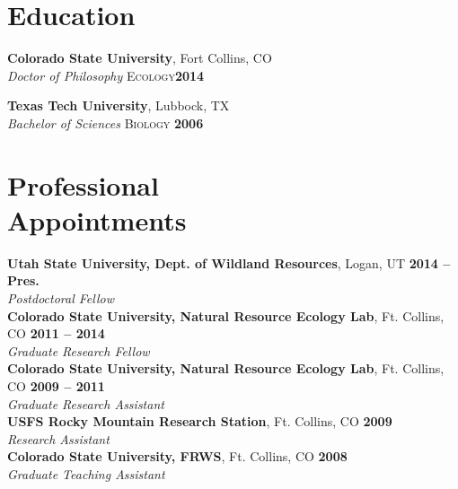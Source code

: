 \documentclass[margin,line]{resume}
\begin{document}
\begin{resume}
    \section{\mysidestyle Education}

    \textbf{Colorado State University}, Fort Collins, CO \vspace{1mm}\\\vspace{1mm}%
    \textsl{Doctor of Philosophy} \textsc{Ecology}\hfill \textbf{2014}\vspace{-3mm}\\\vspace{-1mm}%
    
    \textbf{Texas Tech University}, Lubbock, TX \vspace{1mm}\\\vspace{1mm}%
    \textsl{Bachelor of Sciences} \textsc{Biology} \hfill \textbf{2006}\vspace{-3mm}\\\vspace{-1mm}%
    
    \section{\mysidestyle Professional\\Appointments}
    \textbf{Utah State University, Dept. of Wildland Resources}, Logan, UT \hfill \textbf{2014 -- Pres.} \\
		\textsl{Postdoctoral Fellow} \vspace{.5mm}\\
    \textbf{Colorado State University, Natural Resource Ecology Lab}, Ft. Collins, CO \hfill \textbf{2011 -- 2014}\\
		\textsl{Graduate Research Fellow}\vspace{.5mm}\\ 
    \textbf{Colorado State University, Natural Resource Ecology Lab}, Ft. Collins, CO \hfill \textbf{2009 -- 2011}\\
		\textsl{Graduate Research Assistant}\vspace{.5mm}\\ 
     \textbf{USFS Rocky Mountain Research Station}, Ft. Collins, CO \hfill \textbf{2009}\\
		\textsl{Research Assistant}\vspace{.5mm}\\ 		
     \textbf{Colorado State University, FRWS}, Ft. Collins, CO \hfill \textbf{2008}\\
		\textsl{Graduate Teaching Assistant}\\ 


\end{resume}
\end{document}
